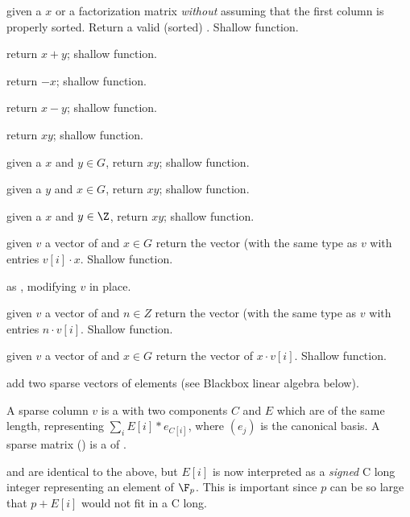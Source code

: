  given a  $x$ or a factorization
matrix \emph{without} assuming that the first column is properly sorted.
Return a valid (sorted) . Shallow function.

 return $x+y$; shallow function.

 return $-x$; shallow function.

 return $x-y$; shallow function.

 return $xy$; shallow function.

 given a  $x$ and $y\in G$,
 return $xy$; shallow function.

 given a  $y$ and $x\in G$,
 return $xy$; shallow function.

 given a  $x$ and $y\in \Z$,
 return $xy$; shallow function.

 given $v$ a vector of  and $x\in
G$ return the vector (with the same type as $v$ with entries $v[i]\cdot x$.
Shallow function.

 as , modifying
$v$ in place.

 given $v$ a vector of  and $n\in
Z$ return the vector (with the same type as $v$ with entries $n \cdot v[i]$.
Shallow function.

 given $v$ a vector of  and $x\in
G$ return the vector of $x \cdot v[i]$. Shallow function.

 add two sparse vectors of
 elements (see Blackbox linear algebra below).


A sparse column  $v$ is a  with two components $C$ and $E$
which are  of the same length, representing $\sum_i
E[i]*e_{C[i]}$, where $(e_j)$ is the canonical basis. A sparse matrix
() is a  of .

 and  are identical to the above, but $E[i]$ is now
interpreted as a \emph{signed} C long integer representing an element of
$\F_p$. This is important since $p$ can be so large that $p+E[i]$ would not
fit in a C long.

